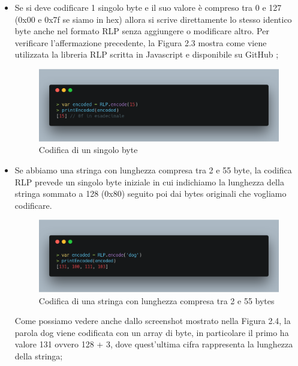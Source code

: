 \documentclass[12pt]{report}
\begin{document}
\begin{itemize}
\item Se si deve codificare 1 singolo byte e il suo valore è compreso tra 0 e 127 (0x00 e 0x7f se siamo in hex) allora si scrive direttamente lo stesso identico byte anche nel formato RLP senza aggiungere o modificare altro.
Per verificare l'affermazione precedente, la Figura 2.3 mostra come viene utilizzata la libreria RLP scritta in Javascript e disponibile su GitHub \cite{RLPGitHub};

\begin{figure}[H]
    \includegraphics[width=\textwidth]{carbon-2} 
    \caption{Codifica di un singolo byte}
\end{figure}

\item Se abbiamo una stringa con lunghezza compresa tra 2 e 55 byte, la codifica RLP prevede un singolo byte iniziale in cui indichiamo la lunghezza della stringa sommato a 128 (0x80) seguito poi dai bytes originali che vogliamo codificare.

\begin{figure}[H]
    \includegraphics[width=\textwidth]{carbon-3}
    \caption{Codifica di una stringa con lunghezza compresa tra 2 e 55 bytes}
\end{figure}

Come possiamo vedere anche dallo screenshot mostrato nella Figura 2.4, la parola dog viene codificata con un array di byte, in particolare il primo ha valore 131 ovvero 128 + 3, dove quest'ultima cifra rappresenta la lunghezza della stringa;


\end{itemize}
\end{document}
